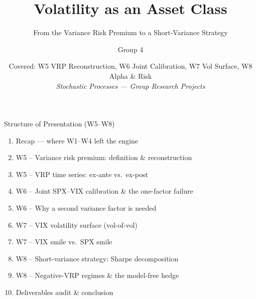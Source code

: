 \documentclass[aspectratio=169, 11pt]{beamer}
\title{Volatility as an Asset Class}
\subtitle{From the Variance Risk Premium to a Short-Variance Strategy}
\author{Group 4}
\date{Covered: W5 VRP Reconstruction, W6 Joint Calibration, W7 Vol Surface, W8 Alpha \& Risk\\[4pt]
\textit{Stochastic Processes --- Group Research Projects}}
\begin{document}
\begin{frame}[plain]
  \titlepage
\end{frame}

\begin{frame}{Structure of Presentation (W5--W8)}
  \begin{enumerate}
    \item Recap --- where W1--W4 left the engine
    \item W5 -- Variance risk premium: definition \& reconstruction
    \item W5 -- VRP time series: ex-ante vs.\ ex-post
    \item W6 -- Joint SPX--VIX calibration \& the one-factor failure
    \item W6 -- Why a second variance factor is needed
    \item W7 -- VIX volatility surface (vol-of-vol)
    \item W7 -- VIX smile vs.\ SPX smile
    \item W8 -- Short-variance strategy: Sharpe decomposition
    \item W8 -- Negative-VRP regimes \& the model-free hedge
    \item Deliverables audit \& conclusion
  \end{enumerate}
\end{frame}
\end{document}
